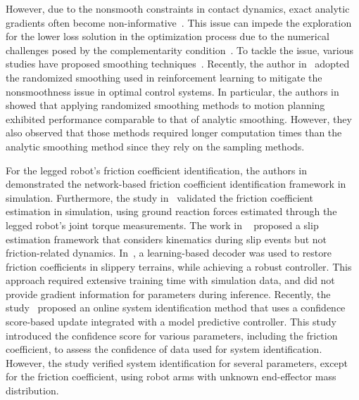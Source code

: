 However, due to the nonsmooth constraints in contact dynamics, exact analytic gradients often become non-informative~\cite{le2024leveraging}. This issue can impede the exploration for
the lower loss solution in the optimization process due to the numerical challenges posed by the complementarity condition~\cite{werling2021fast}.
To tackle the issue, various studies have proposed smoothing techniques~\cite{zachary2024fast,kim2022contact,le2024leveraging,Pang2023TRO}. Recently, the author in~\cite{le2024leveraging} adopted the randomized smoothing used in reinforcement learning to mitigate the nonsmoothness issue in optimal control systems. In particular, the authors in~\cite{Pang2023TRO} showed that applying randomized smoothing methods to motion planning exhibited performance comparable to that of analytic smoothing. However, they also observed that those methods required longer computation times than the analytic smoothing method since they rely on the sampling methods.


For the legged robot's friction coefficient identification, the authors in~\cite{yu2017preparing} demonstrated the network-based friction coefficient identification framework in simulation. Furthermore, the study in~\cite{focchi2018slip} validated the friction coefficient estimation in simulation, using ground reaction forces estimated through the legged robot's joint torque measurements. The work in ~\cite{jenelten2019legged} proposed a slip estimation framework that considers kinematics during slip events but not friction-related dynamics. In~\cite{lee2020learning}, a learning-based decoder was used to restore friction coefficients in slippery terrains, while achieving a robust controller. This approach required extensive training time with simulation data, and did not provide gradient information for parameters during inference. Recently, the study~\cite{chen2022real} proposed an online system identification method that uses a confidence score-based update integrated with a model predictive controller. This study introduced the confidence score for various parameters, including the friction coefficient, to assess the confidence of data used for system identification. However, the study verified system identification for several parameters, except for the friction coefficient, using robot arms with unknown end-effector mass distribution.

